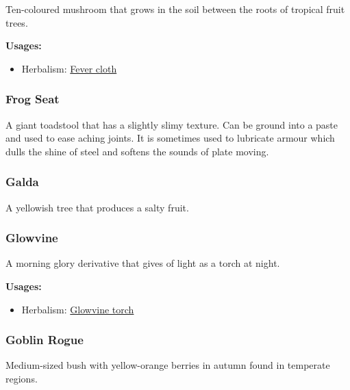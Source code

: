 Ten-coloured mushroom that grows in the soil between the roots of tropical fruit trees.

\vspace{5mm}

\textbf{Usages:}

\begin{itemize}[noitemsep]
\item[] Herbalism: \hyperref[Fever cloth]{Fever cloth}
\end{itemize}

\subsubsection{Frog Seat}
\label{frog_seat}

A giant toadstool that has a slightly slimy texture. Can be ground into a paste and used to ease aching joints. It is sometimes used to lubricate armour which dulls the shine of steel and softens the sounds of plate moving.

\subsubsection{Galda}
\label{Galda}

A yellowish tree that produces a salty fruit.

\subsubsection{Glowvine}
\label{Glowvine}

A morning glory derivative that gives of light as a torch at night.

\vspace{5mm}

\textbf{Usages:}

\begin{itemize}[noitemsep]
\item[] Herbalism: \hyperref[Glowvine torch]{Glowvine torch}
\end{itemize}

\subsubsection{Goblin Rogue}
\label{Goblin Rogue}

Medium-sized bush with yellow-orange berries in autumn found in temperate regions.

\vspace{5mm}

